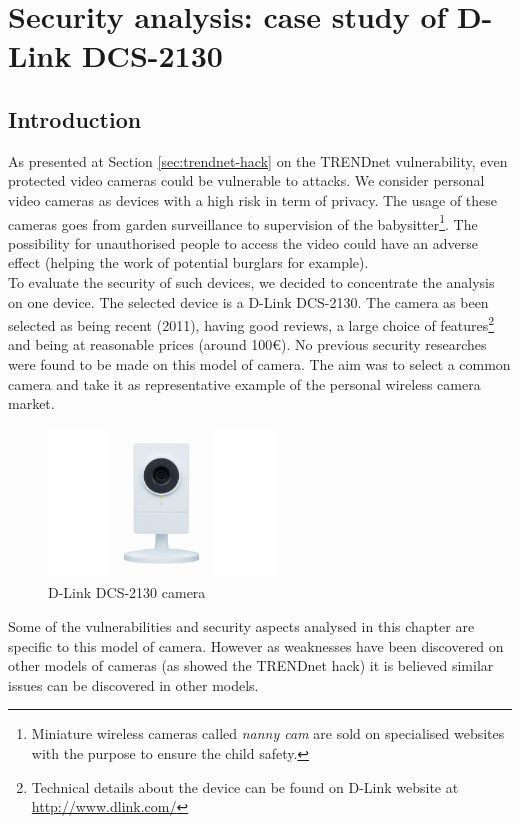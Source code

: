 
\chapter{Security analysis: case study of D-Link DCS-2130}
\label{chap:cam-dcs}

\section*{Introduction}
\label{sec:dcs-intro}

As presented at Section \ref{sec:trendnet-hack} on the TRENDnet vulnerability, even protected video cameras could be vulnerable to attacks.
We consider personal video cameras as devices with a high risk in term of privacy.
The usage of these cameras goes from garden surveillance to supervision of the babysitter\footnote{Miniature wireless cameras called \emph{nanny cam} are sold on specialised websites with the purpose to ensure the child safety.}.
The possibility for unauthorised people to access the video could have an adverse effect (helping the work of potential burglars for example).\\

To evaluate the security of such devices, we decided to concentrate the analysis on one device.
The selected device is a D-Link DCS-2130.
The camera as been selected as being recent (2011), having good reviews, a large choice of features\footnote{Technical details about the device can be found on D-Link website at \url{http://www.dlink.com/}} and being at reasonable prices (around 100€).
No previous security researches were found to be made on this model of camera.
The aim was to select a common camera and take it as representative example of the personal wireless camera market.\\

\begin{figure}[h]
  \centering
  \includegraphics[width=6cm]{images/dcs2130.png}
  \caption{D-Link DCS-2130 camera}
  \label{fig:dcs2130}
\end{figure}

Some of the vulnerabilities and security aspects analysed in this chapter are specific to this model of camera.
However as weaknesses have been discovered on other models of cameras (as showed the TRENDnet hack) it is believed similar issues can be discovered in other models.\\

